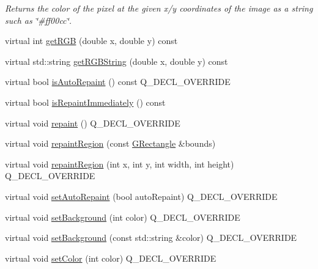 \begin{DoxyCompactItemize}
\begin{DoxyCompactList}\small\item\em Returns the color of the pixel at the given x/y coordinates of the image as a string such as \char`\"{}\#ff00cc\char`\"{}. \end{DoxyCompactList}\item 
virtual int \mbox{\hyperlink{classGDrawingSurface_a9e983467cf0c97cfd62433a8471570dc}{get\+R\+GB}} (double x, double y) const
\item 
virtual std\+::string \mbox{\hyperlink{classGDrawingSurface_a456d3582acc3544f37d939f5cb8802fe}{get\+R\+G\+B\+String}} (double x, double y) const
\item 
virtual bool \mbox{\hyperlink{classGForwardDrawingSurface_aa0b3b78666686fcd2a5b33a20febef0f}{is\+Auto\+Repaint}} () const Q\+\_\+\+D\+E\+C\+L\+\_\+\+O\+V\+E\+R\+R\+I\+DE
\item 
virtual bool \mbox{\hyperlink{classGDrawingSurface_a82a00267c81cc0ae85ee0feb01a92fa8}{is\+Repaint\+Immediately}} () const
\item 
virtual void \mbox{\hyperlink{classGForwardDrawingSurface_ab93427f61c64e3db7f2637519aed1c00}{repaint}} () Q\+\_\+\+D\+E\+C\+L\+\_\+\+O\+V\+E\+R\+R\+I\+DE
\item 
virtual void \mbox{\hyperlink{classGDrawingSurface_a769c46fb3e1004aec76e8b0adfa42aa6}{repaint\+Region}} (const \mbox{\hyperlink{classGRectangle}{G\+Rectangle}} \&bounds)
\item 
virtual void \mbox{\hyperlink{classGForwardDrawingSurface_a52152a764c4c4b092f826eee5d6554aa}{repaint\+Region}} (int x, int y, int width, int height) Q\+\_\+\+D\+E\+C\+L\+\_\+\+O\+V\+E\+R\+R\+I\+DE
\item 
virtual void \mbox{\hyperlink{classGForwardDrawingSurface_ade731c276cd0bcd37639280d06571333}{set\+Auto\+Repaint}} (bool auto\+Repaint) Q\+\_\+\+D\+E\+C\+L\+\_\+\+O\+V\+E\+R\+R\+I\+DE
\item 
virtual void \mbox{\hyperlink{classGForwardDrawingSurface_a427fefbbc34e39e5df27a807da488e0d}{set\+Background}} (int color) Q\+\_\+\+D\+E\+C\+L\+\_\+\+O\+V\+E\+R\+R\+I\+DE
\item 
virtual void \mbox{\hyperlink{classGForwardDrawingSurface_a222fcfb542aa6094c7e0de671bd69627}{set\+Background}} (const std\+::string \&color) Q\+\_\+\+D\+E\+C\+L\+\_\+\+O\+V\+E\+R\+R\+I\+DE
\item 
virtual void \mbox{\hyperlink{classGForwardDrawingSurface_a292eb0ce61f3fdb1d28b17e1e34928f7}{set\+Color}} (int color) Q\+\_\+\+D\+E\+C\+L\+\_\+\+O\+V\+E\+R\+R\+I\+DE

\end{DoxyCompactItemize}
